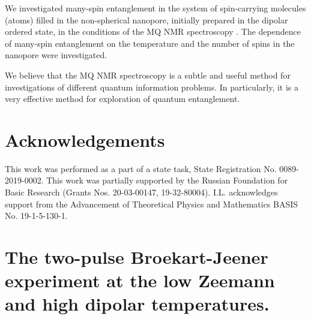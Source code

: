 \documentclass[review]{elsarticle}
\begin{document}
We investigated many-spin entanglement in the system of spin-carrying molecules (atoms) filled in the non-spherical nanopore, initially prepared in the dipolar ordered state, in the conditions of the MQ NMR spectroscopy .
The dependence of many-spin entanglement on the temperature and the number of spins in the nanopore were investigated.

We believe that the MQ NMR spectroscopy is a subtle and useful method for investigations of different quantum information problems.
In particularly, it is a very effective method for exploration of quantum entanglement.



\section{Acknowledgements}
This work was performed as a part of a state task, State Registration No. 0089-2019-0002. 
This work was partially supported by the Russian Foundation for Basic Research (Grants Nos. 20-03-00147, 19-32-80004). 
I.L. acknowledges support from the Advancement of Theoretical Physics and Mathematics BASIS No. 19-1-5-130-1.



\appendix
\section{The two-pulse Broekart-Jeener experiment at the low Zeemann and high dipolar temperatures.}
\end{document}
